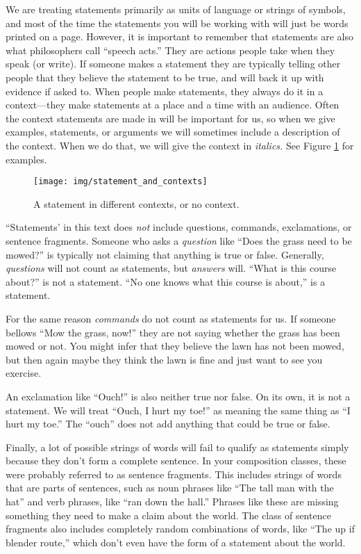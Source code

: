 We are treating statements primarily as units of language or strings of symbols, and most of the time the statements you will be working with will just be words printed on a page. However, it is important to remember that statements are also what philosophers call ``speech acts.'' They are actions people take when they speak (or write). If someone makes a statement they are typically telling other people that they believe the statement to be true, and will back it up with evidence if asked to. When people make statements, they always do it in a context---they make statements at a place and a time with an audience. Often the context statements are made in will be important for us, so when we give examples, statements, or arguments we will sometimes include a description of the context. When we do that, we will give the context in \textit{italics.} See Figure \ref{fig:statements_and_context} for examples. \label{context_marker} 

\begin{figure}
\begin{mdframed}[style=mytableclearbox]
\texttt{[image: img/statement\_and\_contexts]}
\end{mdframed}
\caption{A statement in different contexts, or no context.} \label{fig:statements_and_context}
\end{figure}


``Statements' in this text does \emph{not} include questions, commands, exclamations, or sentence fragments. Someone who asks a \emph{question} like ``Does the grass need to be mowed?'' is typically not claiming that anything is true or false. Generally, \emph{questions} will not count as statements, but \emph{answers} will. ``What is this course about?'' is not a statement. ``No one knows what this course is about,'' is a statement.

For the same reason \emph{commands} do not count as statements for us. If someone bellows ``Mow the grass, now!'' they are not saying whether the grass has been mowed or not. You might infer that they believe the lawn has not been mowed, but then again maybe they think the lawn is fine and just want to see you exercise. 

An exclamation like ``Ouch!'' is also neither true nor false. On its own, it is not a statement. We will treat ``Ouch, I hurt my toe!'' as meaning the same thing as ``I hurt my toe.'' The ``ouch'' does not add anything that could be true or false.

Finally, a lot of possible strings of words will fail to qualify as statements simply because they don't form a complete sentence. In your composition classes, these were probably referred to as sentence fragments. This includes strings of words that are parts of sentences, such as noun phrases like ``The tall man with the hat'' and verb phrases, like ``ran down the hall.'' Phrases like these are missing something they need to make a claim about the world. The class of sentence fragments also includes completely random combinations of words, like ``The up if blender route,'' which don't even have the form of a statement about the world.  

